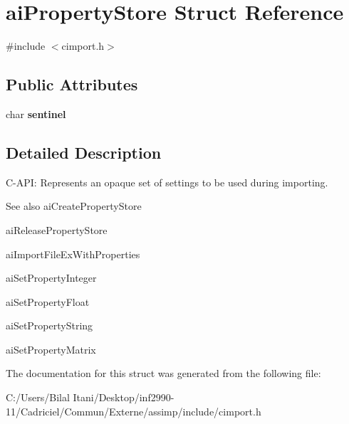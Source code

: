 \hypertarget{structai_property_store}{}\section{ai\+Property\+Store Struct Reference}
\label{structai_property_store}


{\ttfamily \#include $<$cimport.\+h$>$}

\subsection*{Public Attributes}
\begin{DoxyCompactItemize}
\item 
char {\bfseries sentinel}\hypertarget{structai_property_store_a53e97983bdbe38c596c7879555dc42a3}{}\label{structai_property_store_a53e97983bdbe38c596c7879555dc42a3}

\end{DoxyCompactItemize}


\subsection{Detailed Description}
C-\/\+A\+PI\+: Represents an opaque set of settings to be used during importing. \begin{DoxySeeAlso}{See also}
ai\+Create\+Property\+Store 

ai\+Release\+Property\+Store 

ai\+Import\+File\+Ex\+With\+Properties 

ai\+Set\+Property\+Integer 

ai\+Set\+Property\+Float 

ai\+Set\+Property\+String 

ai\+Set\+Property\+Matrix 
\end{DoxySeeAlso}


The documentation for this struct was generated from the following file\+:\begin{DoxyCompactItemize}
\item 
C\+:/\+Users/\+Bilal Itani/\+Desktop/inf2990-\/11/\+Cadriciel/\+Commun/\+Externe/assimp/include/cimport.\+h\end{DoxyCompactItemize}
